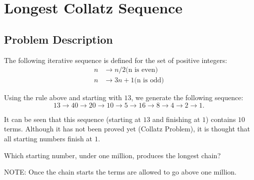 \chapter{Longest Collatz Sequence}
\section{Problem Description}
The following iterative sequence is defined for the set of positive integers:
\begin{align*}
	n& \to n/2 \text{(n is even)} \\
	n& \to 3n + 1 \text{(n is odd)}
\end{align*}

Using the rule above and starting with $13$, we generate the following sequence:
$$13 \to 40 \to 20 \to 10 \to 5 \to 16 \to 8 \to 4 \to 2 \to 1.$$

It can be seen that this sequence (starting at $13$ and finishing at $1$) contains $10$ terms. Although it has not been proved yet (Collatz Problem), it is thought that all starting numbers finish at $1$.

Which starting number, under one million, produces the longest chain?

NOTE: Once the chain starts the terms are allowed to go above one million.
